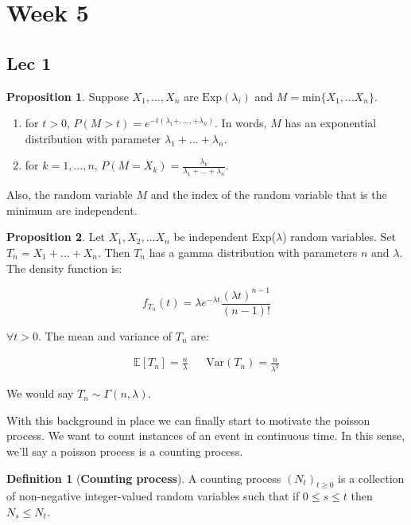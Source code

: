 \documentclass[12pt]{article}
\theoremstyle{definition}
\newtheorem{definition}{Definition}[section]
\newtheorem{proposition}{Proposition}[section]
\begin{document}
\section{Week 5}
\subsection{Lec 1}

\begin{proposition}
Suppose $X_1, \dots, X_n$ are $\text{Exp}(\lambda_i)$ and $M = \text{min}\{X_1, \dots X_n\}$.
\begin{enumerate}
  \item for $t > 0$, $P(M > t) = e^{-t(\lambda_1 + , \dots, + \lambda_n)}$. In words, $M$ has an exponential distribution with parameter $\lambda_1 + \dots + \lambda_n$.
  \item for $k = 1, \dots, n$, $P(M = X_k) = \frac{\lambda_k}{\lambda_1 + \dots + \lambda_n}$.
\end{enumerate}

Also, the random variable $M$ and the index of the random variable that is the minimum are independent.
\end{proposition}

\begin{proposition}
  Let $X_1, X_2, \dots X_n$ be independent Exp($\lambda$) random variables. Set $T_n = X_1 + \dots + X_n$. Then $T_n$ has a gamma distribution with parameters $n$ and $\lambda$. The density function is:

$$
f_{T_n}(t) = \lambda e^{-\lambda t}\frac{(\lambda t)^{n-1}}{(n-1)!}
$$

$\forall t> 0$. The mean and variance of $T_n$ are:

\begin{align*}
  \mathbb{E}[T_n] = \frac{n}{\lambda} && \text{Var}(T_n) = \frac{n}{\lambda^2}
\end{align*}
\end{proposition}

We would say $T_n \sim \Gamma(n, \lambda)$.

With this background in place we can finally start to motivate the poisson process. We want to count instances of an event in continuous time. In this sense, we'll say a poisson process is a counting process.

\begin{definition}[\textbf{Counting process}]
  A counting process $(N_t)_{t \geq 0}$ is a collection of non-negative integer-valued random variables such that if $0 \leq s \leq t$ then $N_s \leq N_t$.
\end{definition}
\end{document}
